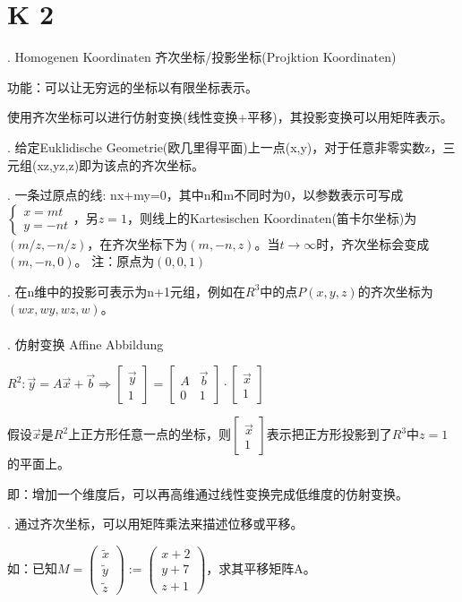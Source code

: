 \documentclass[fleqn]{article}
\begin{document}
\section{K 2}

. Homogenen Koordinaten 齐次坐标/投影坐标(Projktion Koordinaten)

功能：可以让无穷远的坐标以有限坐标表示。

使用齐次坐标可以进行仿射变换(线性变换+平移)，其投影变换可以用矩阵表示。

. 给定Euklidische Geometrie(欧几里得平面)上一点(x,y)，对于任意非零实数z，三元组(xz,yz,z)即为该点的齐次坐标。

. 一条过原点的线: nx+my=0，其中n和m不同时为0，以参数表示可写成$\left\{\begin{aligned}
    x=mt\\y=-nt
\end{aligned}\right.$，另$z=1$，则线上的Kartesischen Koordinaten(笛卡尔坐标)为$(m/z,-n/z)$，在齐次坐标下为$(m,-n,z)$。当$t\rightarrow\infty$时，齐次坐标会变成$(m,-n,0)$。
注：原点为$(0,0,1)$
        
. 在n维中的投影可表示为n+1元组，例如在$R^3$中的点$P(x,y,z)$的齐次坐标为$(wx,wy,wz,w)$。
\\
\\
. 仿射变换 Affine Abbildung

$R^2:\vec{y}=A\vec{x}+\vec{b}\Rightarrow\begin{bmatrix}
    \vec{y}\\1
\end{bmatrix}=\begin{bmatrix}
    A&\vec{b}\\0&1
\end{bmatrix}\cdot\begin{bmatrix}
    \vec{x}\\1
\end{bmatrix}$

假设$\vec{x}$是$R^2$上正方形任意一点的坐标，则$\begin{bmatrix}
    \vec{x}\\1
\end{bmatrix}$表示把正方形投影到了$R^3$中$z=1$的平面上。

即：增加一个维度后，可以再高维通过线性变换完成低维度的仿射变换。

. 通过齐次坐标，可以用矩阵乘法来描述位移或平移。

如：已知$M=\begin{pmatrix}
    \tilde{x}\\\tilde{y}\\\tilde{z}
\end{pmatrix}:=\begin{pmatrix}
    x+2\\y+7\\z+1
\end{pmatrix}$，求其平移矩阵A。
\end{document}
